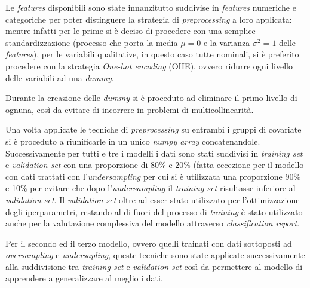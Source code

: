 \documentclass{article}
\begin{document}
Le \textit{features} disponibili sono state innanzitutto suddivise in \textit{features} numeriche e categoriche per poter distinguere la strategia di \textit{preprocessing} a loro applicata: mentre infatti per le prime si è deciso di procedere con una semplice standardizzazione (processo che porta la media $\mu = 0$ e la varianza $\sigma^2 = 1$ delle \textit{features}), per le variabili qualitative, in questo caso tutte nominali, si è preferito procedere con la strategia \textit{One-hot encoding} (OHE), ovvero ridurre ogni livello delle variabili ad una \textit{dummy}.

\begin{warn}[NB:]
Durante la creazione delle \textit{dummy} si è proceduto ad eliminare il primo livello di ognuna, così da evitare di incorrere in problemi di multicollinearità.
\end{warn}

Una volta applicate le tecniche di \textit{preprocessing} su entrambi i gruppi di covariate si è proceduto a riunificarle in un unico \textit{numpy array} concatenandole. Successivamente per tutti e tre i modelli i dati sono stati suddivisi in \textit{training set} e \textit{validation set} con una proporzione di 80\% e 20\% (fatta eccezione per il modello con dati trattati con l'\textit{undersampling} per cui si è utilizzata una proporzione 90\% e 10\% per evitare che dopo l'\textit{undersampling} il \textit{training set} risultasse inferiore al \textit{validation set}. 
Il \textit{validation set} oltre ad esser stato utilizzato per l'ottimizzazione degli iperparametri, restando al di fuori del processo di \textit{training} è stato utilizzato anche per la valutazione complessiva del modello attraverso \textit{classification report}.

\begin{warn}[NB:]
Per il secondo ed il terzo modello, ovvero quelli trainati con dati sottoposti ad \textit{oversampling} e \textit{undersapling}, queste tecniche sono state applicate successivamente alla suddivisione tra \textit{training set} e \textit{validation set} così da permettere al modello di apprendere a generalizzare al meglio i dati.
\end{warn}
\end{document}

